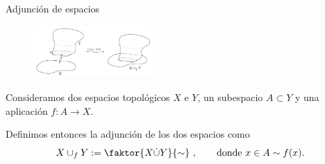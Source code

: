 %

\begin{frame}[fragile]{Adjunción de espacios}
\begin{figure}
\centering
\includegraphics[width = 0.4\textwidth]{images/pegadoespacios}
\end{figure}
Consideramos dos espacios topológicos $X$ e $Y$, un subespacio $A \subset Y$ y una aplicación $f: A \longrightarrow X$. \par
Definimos entonces la adjunción de los dos espacios como
\[ X \cup_f Y := \faktor{X \dot{\cup} Y}{\sim} \ , \qquad \text{donde }x \in A \sim f(x). \]
\end{frame}

